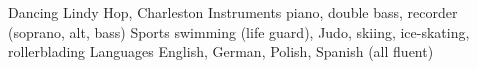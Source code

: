 \begin{cvskills}
  \cvskill
    {Dancing}
    {Lindy Hop, Charleston}
  \cvskill
    {Instruments}
    {piano, double bass, recorder (soprano, alt, bass)}
  \cvskill
    {Sports}
    {swimming (life guard), Judo, skiing, ice-skating, rollerblading}
  \cvskill
    {Languages}
    {English, German, Polish, Spanish (all fluent)}
\end{cvskills}
